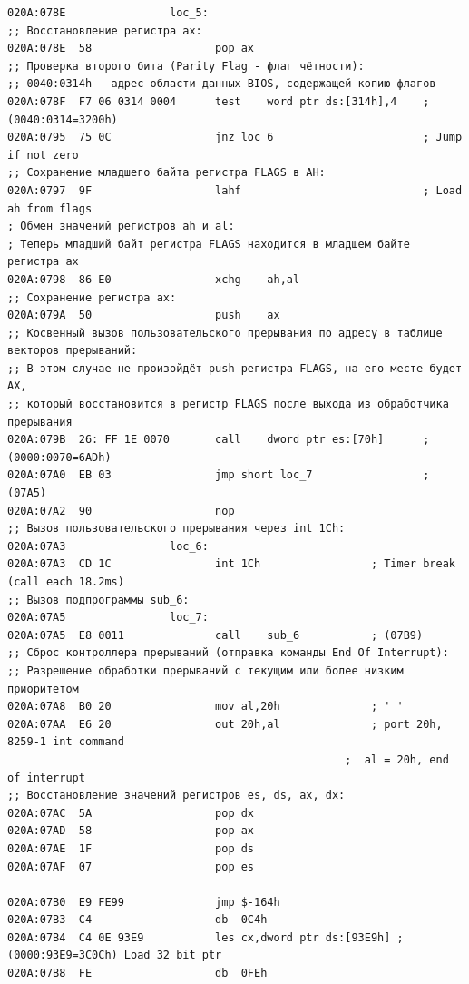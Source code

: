 \documentclass[a4paper,14pt]{article}
\begin{document}
\begin{lstlisting}[style={asm}]
020A:078E				 loc_5:
;; Восстановление регистра ax:
020A:078E  58					pop	ax
;; Проверка второго бита (Parity Flag - флаг чётности):
;; 0040:0314h - адрес области данных BIOS, содержащей копию флагов
020A:078F  F7 06 0314 0004		test	word ptr ds:[314h],4	; (0040:0314=3200h)
020A:0795  75 0C				jnz	loc_6						; Jump if not zero
;; Сохранение младшего байта регистра FLAGS в AH:
020A:0797  9F					lahf							; Load ah from flags
; Обмен значений регистров ah и al: 
; Теперь младший байт регистра FLAGS находится в младшем байте регистра ax
020A:0798  86 E0				xchg	ah,al
;; Сохранение регистра ax:
020A:079A  50					push	ax
;; Косвенный вызов пользовательского прерывания по адресу в таблице векторов прерываний:
;; В этом случае не произойдёт push регистра FLAGS, на его месте будет AX, 
;; который восстановится в регистр FLAGS после выхода из обработчика прерывания
020A:079B  26: FF 1E 0070		call	dword ptr es:[70h]		; (0000:0070=6ADh)
020A:07A0  EB 03				jmp	short loc_7					; (07A5)
020A:07A2  90					nop
;; Вызов пользовательского прерывания через int 1Ch:
020A:07A3				 loc_6:
020A:07A3  CD 1C				int	1Ch					; Timer break (call each 18.2ms)
;; Вызов подпрограммы sub_6:
020A:07A5				 loc_7:
020A:07A5  E8 0011				call	sub_6			; (07B9)
;; Сброс контроллера прерываний (отправка команды End Of Interrupt):
;; Разрешение обработки прерываний с текущим или более низким приоритетом
020A:07A8  B0 20				mov	al,20h				; ' '
020A:07AA  E6 20				out	20h,al				; port 20h, 8259-1 int command
													;  al = 20h, end of interrupt
;; Восстановление значений регистров es, ds, ax, dx:					
020A:07AC  5A					pop	dx
020A:07AD  58					pop	ax
020A:07AE  1F					pop	ds
020A:07AF  07					pop	es

020A:07B0  E9 FE99				jmp	$-164h
020A:07B3  C4					db	0C4h
020A:07B4  C4 0E 93E9			les	cx,dword ptr ds:[93E9h]	; (0000:93E9=3C0Ch) Load 32 bit ptr
020A:07B8  FE					db	0FEh
\end{lstlisting}
\clearpage
\end{document}

